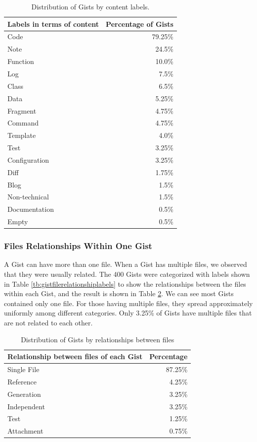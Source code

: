 \begin{table}[!htb]
 \begin{center}
 \begin{tabular}{@{}lr} \hline
    \textbf{Labels in terms of content}	&	\textbf{Percentage of Gists} \\ \hline
	Code & 79.25\%\\
	Note & 24.5\%\\
	Function & 10.0\%\\
	Log & 7.5\%\\
	Class & 6.5\%\\
	Data & 5.25\%\\
	Fragment & 4.75\%\\
	Command & 4.75\%\\
	Template & 4.0\%\\
	Test & 3.25\%\\
	Configuration & 3.25\%\\
	Diff & 1.75\%\\
	Blog & 1.5\%\\
	Non-technical & 1.5\%\\
	Documentation & 0.5\%\\
	Empty & 0.5\%\\ \hline
 \end{tabular}
 \end{center}
 \caption{Distribution of Gists by content labels.}
 \label{tb:labels}
\end{table}

\subsubsection{Files Relationships Within One Gist}
A Gist can have more than one file. When a Gist has multiple files, we observed that they were usually related. The 400 Gists were categorized with labels shown in Table \ref{tb:gistfilerelationshiplabels} to show the relationships between the files within each Gist, and the result is shown in Table \ref{tb:relationship}. We can see most Gists contained only one file. For those having multiple files, they spread approximately uniformly among different categories. Only 3.25\% of Gists have multiple files that are not related to each other. 

\begin{table}[!htb]
 \begin{center}
 \begin{tabular}{lr}
    \textbf{Relationship between files of each Gist}	&	\textbf{Percentage} \\ \hline
	Single File & 87.25\%\\
	Reference & 4.25\%\\
	Generation & 3.25\%\\
	Independent & 3.25\%\\
	Test & 1.25\%\\
	Attachment & 0.75\%\\ \hline
 \end{tabular}
 \end{center}
 \caption{Distribution of Gists by relationships between files}
 \label{tb:relationship}
\end{table}